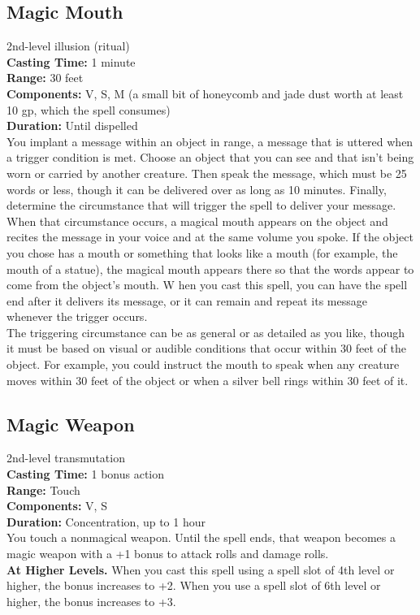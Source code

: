 \documentclass[11pt, A4paper, english]{article}
\begin{document}
		\subsection{Magic Mouth}
2nd-level illusion (ritual) \\
\textbf{Casting Time:} 1 minute \\
\textbf{Range:} 30 feet \\
\textbf{Components:} V, S, M (a small bit of honeycomb and jade dust worth at least 10 gp, which the spell consumes) \\
\textbf{Duration:} Until dispelled \\
You implant a message within an object in range, a message that is uttered when a trigger condition is met. Choose an object that you can see and that isn't being worn or carried by another creature. Then speak the message, which must be 25 words or less, though it can be delivered over as long as 10 minutes. Finally, determine the circumstance that will trigger the spell to deliver your message. \\
When that circumstance occurs, a magical mouth appears on the object and recites the message in your voice and at the same volume you spoke. If the object you chose has a mouth or something that looks like a mouth (for example, the mouth of a statue), the magical mouth appears there so that the words appear to come from the object’s mouth. W hen you cast this spell, you can have the spell end after it delivers its message, or it can remain and repeat its message whenever the trigger occurs. \\
The triggering circumstance can be as general or as detailed as you like, though it must be based on visual or audible conditions that occur within 30 feet of the object. For example, you could instruct the mouth to speak when any creature moves within 30 feet of the object or when a silver bell rings within 30 feet of it.

		\subsection{Magic Weapon}
2nd-level transmutation \\
\textbf{Casting Time:} 1 bonus action \\
\textbf{Range:} Touch \\
\textbf{Components:} V, S \\
\textbf{Duration:} Concentration, up to 1 hour \\
You touch a nonmagical weapon. Until the spell ends, that weapon becomes a magic weapon with a +1 bonus to attack rolls and damage rolls. \\
\textbf{At Higher Levels.} When you cast this spell using a spell slot of 4th level or higher, the bonus increases to +2. When you use a spell slot of 6th level or higher, the bonus increases to +3.
\end{document}
